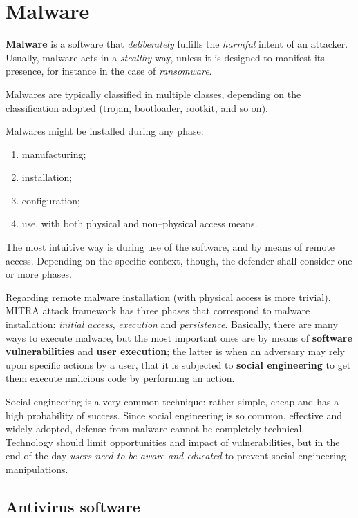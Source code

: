 \documentclass[10pt]{extbook}
\begin{document}
\section{Malware}

\textbf{Malware} is a software that \emph{deliberately} fulfills the
\emph{harmful} intent of an attacker. Usually, malware acts in a
\emph{stealthy} way, unless it is designed to manifest its presence, for
instance in the case of \emph{ransomware}.

Malwares are typically classified in multiple classes, depending on the
classification adopted (trojan, bootloader, rootkit, and so on).

Malwares might be installed during any phase:
\begin{enumerate}
    \item manufacturing;
    \item installation;
    \item configuration;
    \item use, with both physical and non--physical access means.
\end{enumerate}

The most intuitive way is during use of the software, and by means of remote
access. Depending on the specific context, though, the defender shall consider
one or more phases.

Regarding remote malware installation (with physical access is more trivial),
MITRA attack framework has three phases that correspond to malware
installation: \emph{initial access}, \emph{execution} and \emph{persistence}.
Basically, there are many ways to execute malware, but the most important ones
are by means of \textbf{software vulnerabilities} and \textbf{user execution};
the latter is when an adversary may rely upon specific actions by a user, that
it is subjected to \textbf{social engineering} to get them execute malicious
code by performing an action.

Social engineering is a very common technique: rather simple, cheap and has a
high probability of success. Since social engineering is so common, effective
and widely adopted, defense from malware cannot be completely technical.
Technology should limit opportunities and impact of vulnerabilities, but in the
end of the day \emph{users need to be aware and educated} to prevent social
engineering manipulations.

\subsection{Antivirus software}
\end{document}
